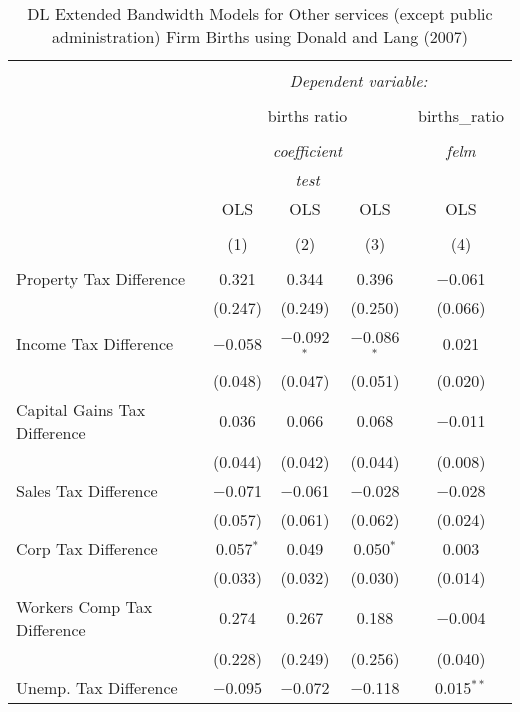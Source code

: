 
\begin{table}[!htbp] \centering 
  \caption{DL Extended Bandwidth Models for  Other services (except public administration) Firm Births using Donald and Lang (2007)} 
  \label{} 
\begin{tabular}{@{\extracolsep{5pt}}lcccc} 
\\[-1.8ex]\hline 
\hline \\[-1.8ex] 
 & \multicolumn{4}{c}{\textit{Dependent variable:}} \\ 
\cline{2-5} 
\\[-1.8ex] & \multicolumn{3}{c}{births ratio} & births\_ratio \\ 
\\[-1.8ex] & \multicolumn{3}{c}{\textit{coefficient}} & \textit{felm} \\ 
 & \multicolumn{3}{c}{\textit{test}} & \textit{} \\ 
 & OLS & OLS & OLS & OLS \\ 
\\[-1.8ex] & (1) & (2) & (3) & (4)\\ 
\hline \\[-1.8ex] 
 Property Tax Difference & 0.321 & 0.344 & 0.396 & $-$0.061 \\ 
  & (0.247) & (0.249) & (0.250) & (0.066) \\ 
  Income Tax Difference & $-$0.058 & $-$0.092$^{*}$ & $-$0.086$^{*}$ & 0.021 \\ 
  & (0.048) & (0.047) & (0.051) & (0.020) \\ 
  Capital Gains Tax Difference & 0.036 & 0.066 & 0.068 & $-$0.011 \\ 
  & (0.044) & (0.042) & (0.044) & (0.008) \\ 
  Sales Tax Difference & $-$0.071 & $-$0.061 & $-$0.028 & $-$0.028 \\ 
  & (0.057) & (0.061) & (0.062) & (0.024) \\ 
  Corp Tax Difference & 0.057$^{*}$ & 0.049 & 0.050$^{*}$ & 0.003 \\ 
  & (0.033) & (0.032) & (0.030) & (0.014) \\ 
  Workers Comp Tax Difference & 0.274 & 0.267 & 0.188 & $-$0.004 \\ 
  & (0.228) & (0.249) & (0.256) & (0.040) \\ 
  Unemp. Tax Difference & $-$0.095 & $-$0.072 & $-$0.118 & 0.015$^{**}$ \\ 

\end{tabular}
\end{table}
